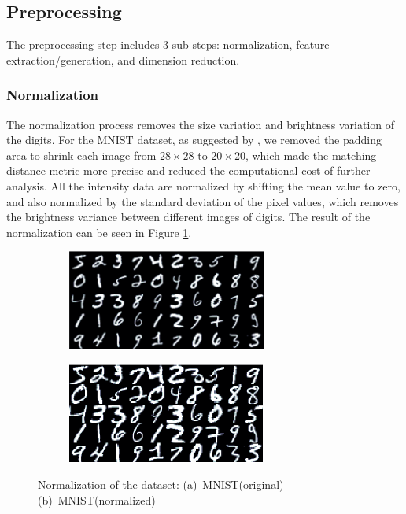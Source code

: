 \documentclass[12pt]{article}
\begin{document}
\subsection{Preprocessing}

The preprocessing step includes 3 sub-steps: normalization, feature extraction/generation, and dimension reduction. 

\subsubsection{Normalization}
The normalization process removes the size variation and brightness variation of the digits. For the MNIST dataset, as suggested by \cite{lecun1998gradient}, we removed the padding area to shrink each image from $28 \times 28$ to $20 \times 20$, which made the matching distance metric more precise and reduced the computational cost of further analysis. All the intensity data are normalized by shifting the mean value to zero, and also normalized by the standard deviation of the pixel values, which removes the brightness variance between different images of digits. The result of the normalization can be seen in Figure \ref{fig:norm}.

\begin{figure}[tbp]
	\centering
	\begin{subfigure}{.45\textwidth}
		\includegraphics[height = 1.3in]{MNIST}		
		\caption{ }
	\end{subfigure}
	\begin{subfigure}{.45\textwidth}
		\includegraphics[height = 1.3in]{MNIST_norm}		
		\caption{ }
	\end{subfigure}
	\caption{Normalization of the dataset: (a)~MNIST(original) (b)~MNIST(normalized)}
	\label{fig:norm}
\end{figure}
\end{document}
